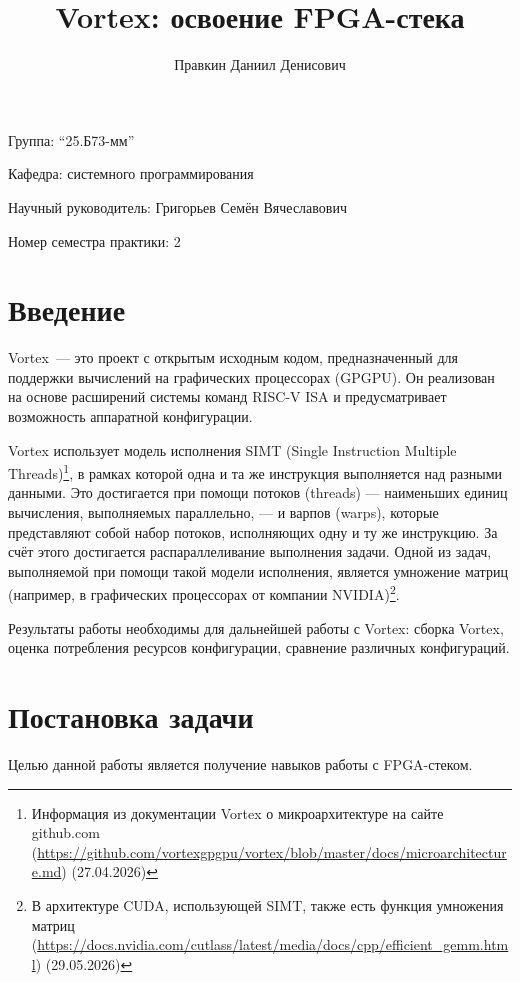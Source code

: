 \documentclass[a4paper]{article}
\title{Vortex: освоение FPGA-стека}
\author{Правкин Даниил Денисович}
\date{}
\begin{document}
\maketitle

\begin{flushright}
    Группа: \enquote{25.Б73-мм}

    Кафедра: системного программирования


    Научный руководитель: Григорьев Семён Вячеславович

    
    Номер семестра практики: 2
\end{flushright} 


\section{Введение}

Vortex~--- это проект с открытым исходным кодом, предназначенный для поддержки вычислений на графических процессорах (GPGPU). Он реализован на основе расширений системы команд RISC-V ISA и предусматривает возможность аппаратной конфигурации.

Vortex использует модель исполнения SIMT (Single Instruction Multiple Threads)\footnote{Информация из документации Vortex о микроархитектуре на сайте github.com (\url{https://github.com/vortexgpgpu/vortex/blob/master/docs/microarchitecture.md}) (27.04.2026)}, в рамках которой одна и та же инструкция выполняется над разными данными. Это достигается при помощи потоков (threads) --- наименьших единиц вычисления, выполняемых параллельно, --- и варпов (warps), которые представляют собой набор потоков, исполняющих одну и ту же инструкцию. За счёт этого достигается распараллеливание выполнения задачи. Одной из задач, выполняемой при помощи такой модели исполнения, является умножение матриц (например, в графических процессорах от компании NVIDIA)\footnote{В архитектуре CUDA, использующей SIMT, также есть функция умножения матриц (\url{https://docs.nvidia.com/cutlass/latest/media/docs/cpp/efficient_gemm.html}) (29.05.2026)}.

Результаты работы необходимы для дальнейшей работы с Vortex: сборка Vortex, оценка потребления ресурсов конфигурации, сравнение различных конфигураций.

\section{Постановка задачи}

Целью данной работы является получение навыков работы с FPGA-стеком.
\end{document}
